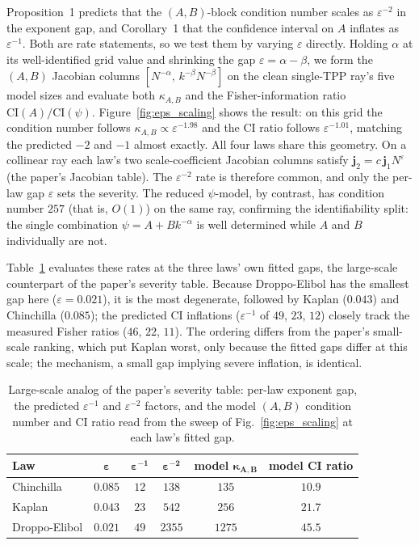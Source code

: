 \documentclass[11pt]{article}
\newcommand{\kAB}{\kappa_{A,B}}
\begin{document}
Proposition~1 predicts that the $(A,B)$-block condition number scales as $\varepsilon^{-2}$ in the
exponent gap, and Corollary~1 that the confidence interval on $A$ inflates as $\varepsilon^{-1}$.
Both are rate statements, so we test them by varying $\varepsilon$ directly. Holding $\alpha$ at its
well-identified grid value and shrinking the gap $\varepsilon=\alpha-\beta$, we form the $(A,B)$
Jacobian columns $[N^{-\alpha},\,k^{-\beta}N^{-\beta}]$ on the clean single-TPP ray's five model
sizes and evaluate both $\kAB$ and the Fisher-information ratio $\mathrm{CI}(A)/\mathrm{CI}(\psi)$.
Figure~\ref{fig:eps_scaling} shows the result: on this grid the condition number follows
$\kAB\propto\varepsilon^{-1.98}$ and the CI ratio follows $\varepsilon^{-1.01}$, matching the
predicted $-2$ and $-1$ almost exactly. All four laws share this geometry. On a collinear ray each
law's two scale-coefficient Jacobian columns satisfy $\mathbf{j}_2=c\,\mathbf{j}_1 N^{\varepsilon}$
(the paper's Jacobian table). The $\varepsilon^{-2}$ rate is therefore common, and only the
per-law gap $\varepsilon$ sets the severity. The reduced $\psi$-model, by contrast, has condition number
$257$ (that is, $O(1)$) on the same ray, confirming the identifiability split: the single
combination $\psi=A+Bk^{-\alpha}$ is well determined while $A$ and $B$ individually are not.

Table~\ref{tab:severity_ls} evaluates these rates at the three laws' own fitted gaps, the
large-scale counterpart of the paper's severity table. Because Droppo-Elibol has the smallest gap
here ($\varepsilon=0.021$), it is the most degenerate, followed by Kaplan ($0.043$) and Chinchilla
($0.085$); the predicted CI inflations ($\varepsilon^{-1}$ of $49$, $23$, $12$) closely track the
measured Fisher ratios ($46$, $22$, $11$). The ordering differs from the paper's small-scale
ranking, which put Kaplan worst, only because the fitted gaps differ at this scale; the mechanism,
a small gap implying severe inflation, is identical.

\begin{table}[t]
\centering
\caption{Large-scale analog of the paper's severity table: per-law exponent gap, the predicted
$\varepsilon^{-1}$ and $\varepsilon^{-2}$ factors, and the model $(A,B)$ condition number and CI
ratio read from the sweep of Fig.~\ref{fig:eps_scaling} at each law's fitted gap.}
\label{tab:severity_ls}
\begin{tabular}{lccccc}
\toprule
\textbf{Law} & $\boldsymbol{\varepsilon}$ & $\boldsymbol{\varepsilon^{-1}}$ &
$\boldsymbol{\varepsilon^{-2}}$ & \textbf{model} $\boldsymbol{\kAB}$ & \textbf{model CI ratio}\\
\midrule
Chinchilla    & $0.085$ & $12$ & $138$  & $135$  & $10.9$\\
Kaplan        & $0.043$ & $23$ & $542$  & $256$  & $21.7$\\
Droppo-Elibol & $0.021$ & $49$ & $2355$ & $1275$ & $45.5$\\
\bottomrule
\end{tabular}
\end{table}
\end{document}
